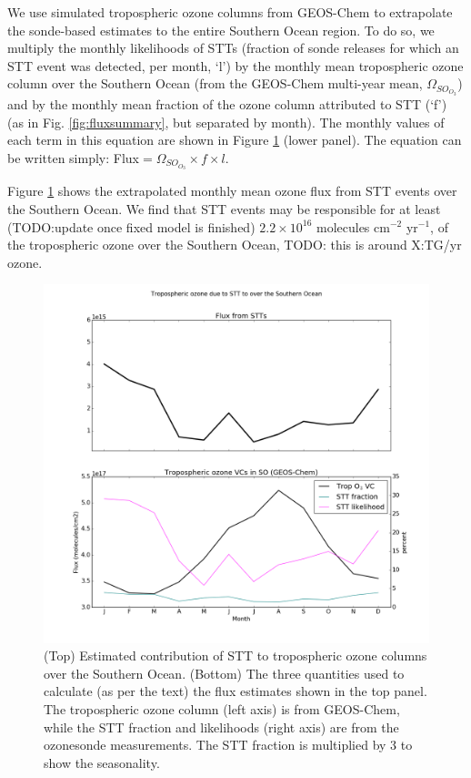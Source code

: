\documentclass{article}
\begin{document}
  We use simulated tropospheric ozone columns from GEOS-Chem to extrapolate the sonde-based estimates to the entire Southern Ocean region. 
  To do so, we multiply the monthly likelihoods of STTs (fraction of sonde releases for which an STT event was detected, per month, `l') by the monthly mean tropospheric ozone column over the Southern Ocean (from the GEOS-Chem multi-year mean, $\Omega_{SO_{O_3}}$) and by the monthly mean fraction of the ozone column attributed to STT (`f') (as in Fig. \ref{fig:fluxsummary}, but separated by month).
  The monthly values of each term in this equation are shown in Figure \ref{fig:SOExtrapolation} (lower panel).
  The equation can be written simply: Flux$= \Omega_{SO_{O_3}} \times f \times l$.
  
  Figure \ref{fig:SOExtrapolation} shows the extrapolated monthly mean ozone flux from STT events over the Southern Ocean.
  We find that STT events may be responsible for at least (TODO:update once fixed model is finished) $2.2\times10^{16}$ molecules cm$^{-2}$ yr$^{-1}$, of the tropospheric ozone over the Southern Ocean, TODO: this is around X:TG/yr ozone.
    
  \begin{figure}[!htbp]
    \includegraphics[width=\textwidth]{figures/SO_extrapolation.png}
    \caption{(Top) Estimated contribution of STT to tropospheric ozone columns over the Southern Ocean.
      (Bottom) The three quantities used to calculate (as per the text) the flux estimates shown in the top panel.
      The tropospheric ozone column (left axis) is from GEOS-Chem, while the STT fraction and likelihoods (right axis) are from the ozonesonde measurements.
      The STT fraction is multiplied by 3 to show the seasonality.}
    \label{fig:SOExtrapolation}
  \end{figure}
  
\end{document}
